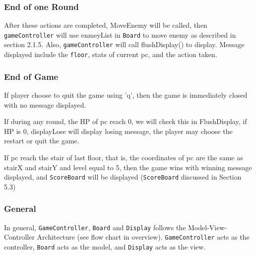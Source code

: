 \documentclass[11pt]{article}
\theoremstyle{plain} \newtheorem{theorem*}{Theorem}[subsection]
\begin{document}
\subsubsection{End of one Round}

After these actions are completed, \textsf{MoveEnemy} will be called,
then \texttt{gameController} will use \textsf{enmeyList} in \texttt{Board}
to move enemy as described in section 2.1.5. Also, \texttt{gameController}
will call \textsf{flushDisplay()} to display. Message displayed include
the \texttt{floor}, stats of current \textsf{pc}, and the action taken.\\

\subsubsection{End of Game}

If player choose to quit the game using 'q', then the game is immediately 
closed with no message displayed.

If during any round, the HP of \textsf{pc} reach 0, we will check this
in \textsf{FlushDisplay}, if HP is 0, \textsf{displayLose} will display
losing message, the player may choose the restart or quit the game.

If \textsf{pc} reach the stair of last floor, that is, the coordinates of
\textsf{pc} are the same as \textsf{stairX} and \textsf{stairY} and 
\textsf{level} equal to 5, then the game wins with winning message displayed,
and \texttt{ScoreBoard} will be displayed (\texttt{ScoreBoard} discussed in
Section 5.3)

\subsubsection{General}
In general, \texttt{GameController}, \texttt{Board} and \texttt{Display} 
follows the Model-View-Controller Architecture (see flow chart in overview). 
\texttt{GameController} acts as the controller, \texttt{Board} acts as the model, 
and \texttt{Display} acts as the view.










\end{document}
